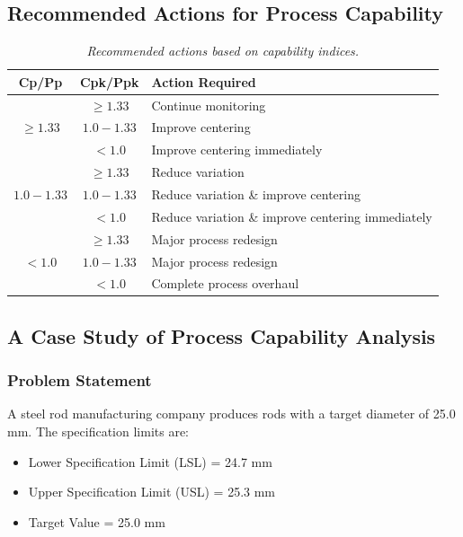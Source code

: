 \documentclass[twoside]{book}
\begin{document}
\subsection{Recommended Actions for Process Capability}

\begin{table}[H]
\centering
\begin{tabular}{c|c|l}
\toprule
\textbf{Cp/Pp} & \textbf{Cpk/Ppk} & \textbf{Action Required} \\
\midrule
\multirow{3}{*}{$\geq 1.33$} & $\geq 1.33$ & Continue monitoring \\
& $1.0 - 1.33$ & Improve centering \\
& $< 1.0$ & Improve centering immediately \\
\midrule
\multirow{3}{*}{$1.0 - 1.33$} & $\geq 1.33$ & Reduce variation \\
& $1.0 - 1.33$ & Reduce variation \& improve centering \\
& $< 1.0$ & Reduce variation \& improve centering immediately \\
\midrule
\multirow{3}{*}{$< 1.0$} & $\geq 1.33$ & Major process redesign \\
& $1.0 - 1.33$ & Major process redesign \\
& $< 1.0$ & Complete process overhaul \\
\bottomrule
\end{tabular}
\caption{\textit{Recommended actions based on capability indices.}}
\end{table}

\subsection{A Case Study of Process Capability Analysis}

\subsubsection{Problem Statement}

A steel rod manufacturing company produces rods with a target diameter of 25.0 mm. The specification limits are:
\begin{itemize}
    \item Lower Specification Limit (LSL) = 24.7 mm
    \item Upper Specification Limit (USL) = 25.3 mm
    \item Target Value = 25.0 mm
\end{itemize}
\end{document}
